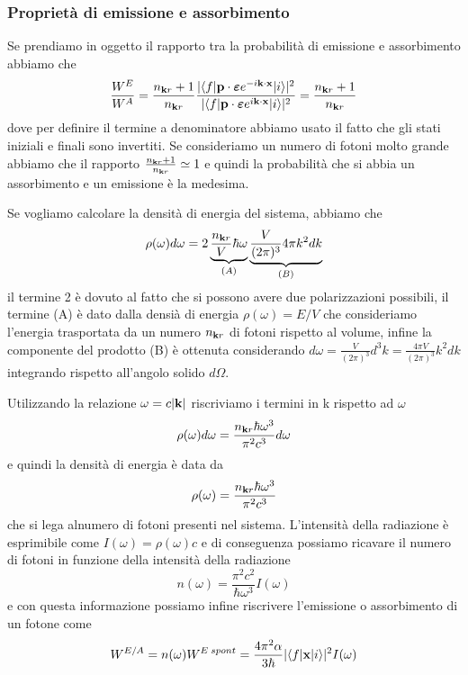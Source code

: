 \subsubsection{Propriet\`a di emissione e assorbimento}

Se prendiamo in oggetto il rapporto tra la probabilit\`a di emissione e assorbimento abbiamo che 
\begin{equation*}
	\frac{W^E}{W^A} = \frac{n_{\bold{k}r}+1}{n_{\bold{k}r}} \frac{|\langle f|\bold{p} \cdot \boldsymbol{\varepsilon}e^{-i \bold{k} \cdot \bold{x}}|i \rangle|^2}{|\langle f|\bold{p} \cdot \boldsymbol{\varepsilon}e^{i \bold{k} \cdot \bold{x}}|i \rangle|^2} =  \frac{n_{\bold{k}r}+1}{n_{\bold{k}r}}
\end{equation*}
dove per definire il termine a denominatore abbiamo usato il fatto che gli stati iniziali e finali sono invertiti. Se consideriamo un numero di fotoni molto grande abbiamo che il rapporto $\frac{n_{\bold{k}r}+1}{n_{\bold{k}r}} \simeq 1$ e quindi la probabilit\`a che si abbia un assorbimento e un emissione \`e la medesima.

Se vogliamo calcolare la densit\`a di energia del sistema, abbiamo che 
\begin{equation*}
	\rho(\omega) d\omega = 2 \underbrace{\frac{n_{\bold{k}r}}{V} \hbar \omega}_{(A)} \underbrace{\frac{V}{(2 \pi)^3}4 \pi k^2dk}_{(B)}
\end{equation*} 
il termine 2 \`e dovuto al fatto che si possono avere due polarizzazioni possibili, il termine (A) \`e dato dalla densi\`a di energia $\rho(\omega)=E/V$ che consideriamo l'energia trasportata da un numero $n_{\bold{k}r}$ di fotoni rispetto al volume, infine la componente del prodotto (B) \`e ottenuta considerando $d \omega = \frac{V}{(2 \pi)^3}d^3k =\frac{4 \pi V}{(2 \pi)^3} k^2dk $ integrando rispetto all'angolo solido $d \Omega$. 

Utilizzando la relazione $\omega = c |\bold{k}|$ riscriviamo i termini in k rispetto ad $\omega$
\begin{equation*}
	\rho(\omega) d\omega = \frac{n_{\bold{k}r} \hbar \omega^3}{\pi^2c^3}d \omega
\end{equation*}
e quindi la densit\`a di energia \`e data da 
\begin{equation}
	\rho(\omega) = \frac{n_{\bold{k}r} \hbar \omega^3}{\pi^2c^3}
\end{equation}
che si lega alnumero di fotoni presenti nel sistema. L'intensit\`a della radiazione \`e esprimibile come $I(\omega) = \rho(\omega)c$ e di conseguenza possiamo ricavare il numero di fotoni in funzione della intensit\`a della radiazione
\begin{equation}
	n(\omega) = \frac{\pi^2 c^2}{\hbar \omega^3}I(\omega)
\end{equation} 
e con questa informazione possiamo infine riscrivere l'emissione o assorbimento di un fotone come
\begin{equation}
	W^{E/A} = n(\omega)W^{E \; spont} = \frac{4 \pi^2 \alpha}{3 \hbar}|\langle f |\bold{x} |i \rangle|^2 I(\omega)
\end{equation}
\newpage

